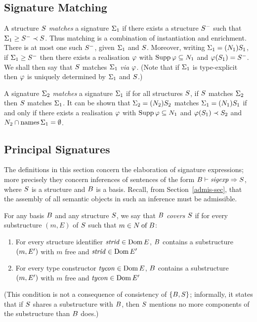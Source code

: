 \subsection{Signature Matching}
\label{sigmatch-sec}
A structure $\S$ {\sl matches} a signature $\sig_1$ if there exists
a structure $\S^-$ such that $\sig_1\geq\S^-\prec\S$. Thus matching
is a combination of instantiation and enrichment. There is at most
one such $\S^-$, given $\sig_1$ and $\S$. Moreover, writing $\sig_1=
\longsig{1}$, if $\sig_1\geq\S^-$ then there exists a realisation $\rea$
with $\Supp\rea\subseteq\N_1$ and $\rea(\S_1)=\S^-$.
We shall then say that $\S$ matches $\sig_1$ {\em via} $\rea$.
(Note that if $\sig_1$ is type-explicit 
then $\rea$ is uniquely determined by $\sig_1$ and $\S$.)

A signature $\sig_2$ {\em matches} a signature $\sig_1$
if for all structures $\S$, if $\S$ matches $\sig_2$ then $\S$
matches $\sig_1$. It can be shown that $\sig_2=\longsig{2}$ matches
$\sig_1=\longsig{1}$ if and only if there exists a realisation
$\rea$ with $\Supp\rea\subseteq\N_1$ and $\rea(\S_1)\prec\S_2$
and $\N_2\cap\NamesFcn\sig_1=\emptyset$.

\subsection{Principal Signatures}
\label{prinsig-sec}
The definitions in this section concern the elaboration of signature
expressions; more precisely they concern inferences of sentences of the
form $\B\ts\sigexp\ra\S$, where $\S$ is a structure and $\B$ is a basis.
Recall, from Section~\ref{admis-sec}, that the assembly of all semantic
objects in such an inference must be admissible.

For any basis $\B$ and any structure $\S$, 
we say that $\B$ {\sl covers} $\S$
if for every substructure $(m,E)$ of $\S$ such that
$m\in\of{\N}{\B}$:
\begin{enumerate}
\item
For every structure identifier $\strid\in\Dom\E$,
$\B$ contains a substructure $(m,\E')$ with $m$
free and $\strid\in\Dom\E'$
\item
For every type constructor $\tycon\in\Dom\E$,
$\B$ contains a substructure $(m,\E')$ with $m$ free
and $\tycon\in\Dom\E'$
\end{enumerate}
(This condition is not a consequence of consistency of $\{\B,\S\}$; 
informally, it states that if $\S$ shares a substructure with $\B$,
then $\S$ mentions no more components of the substructure than
$\B$ does.)



